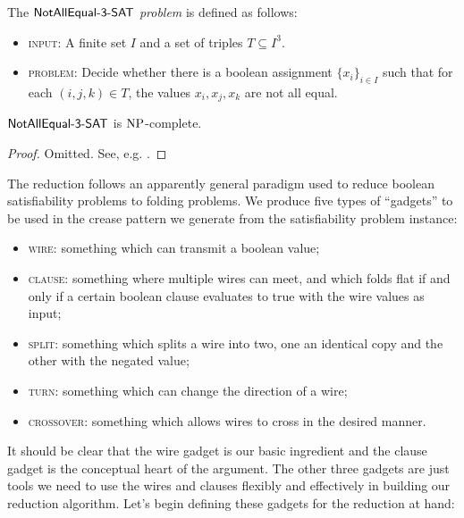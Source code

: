 \begin{definition}
  \label{notallequal}
  The \emph{$\mathsf{NotAllEqual\text{-} 3\text{-} SAT}$ problem} is defined as follows:
  \begin{itemize}
  \item \textsc{input}: A finite set $I$ and a set of triples $T
    \subseteq I^3$.
  \item \textsc{problem}: Decide whether there is a boolean assignment
    $\{x_i\}_{i \in I}$ such that for each $(i,j,k) \in T$, the values
    $x_i,x_j,x_k$ are not all equal.
  \end{itemize}
\end{definition}

\begin{proposition}
  \label{nae-hard}
  $\mathsf{NotAllEqual\text{-} 3\text{-} SAT}$ is $\mathrm{NP}$-complete.
\end{proposition}

\begin{proof}
  Omitted. See, e.g. \cite{schaefer-complexity}.
\end{proof}

The reduction follows an apparently general paradigm used to reduce
boolean satisfiability problems to folding problems. We produce five
types of ``gadgets'' to be used in the crease pattern we generate from
the satisfiability problem instance:
\begin{itemize}
\item \textsc{wire}: something which can transmit a boolean value;
\item \textsc{clause}: something where multiple wires can meet, and
  which folds flat if and only if a certain boolean clause evaluates
  to true with the wire values as input;
\item \textsc{split}: something which splits a wire into two, one an
  identical copy and the other with the negated value;
\item \textsc{turn}: something which can change the direction of a
  wire;
\item \textsc{crossover}: something which allows wires to cross
  in the desired manner.
\end{itemize}
It should be clear that the wire gadget is our basic ingredient and
the clause gadget is the conceptual heart of the argument. The other
three gadgets are just tools we need to use the wires and clauses
flexibly and effectively in building our reduction algorithm. Let's
begin defining these gadgets for the reduction at hand:

